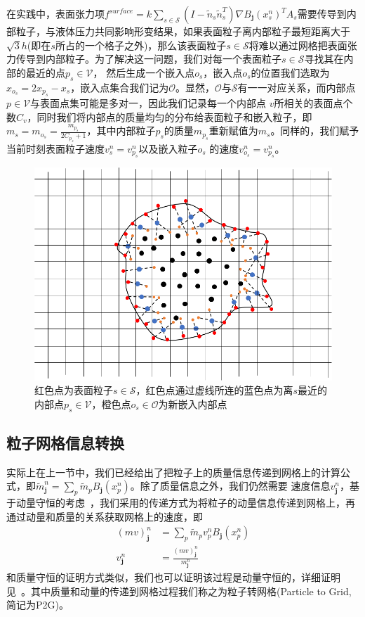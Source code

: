 在实践中，表面张力项$f^{surface} = k\sum_{s\in \mathcal{S}}(I - \tilde{n}_s\tilde{n}_s^T)\nabla B_{\mathbf{j}}(x_s^n)^TA_s$需要传导到内部粒子，与液体压力共同影响形变结果，如果表面粒子离内部粒子最短距离大于
$\sqrt{3}h$(即在$s$所占的一个格子之外)，那么该表面粒子$s\in \mathcal{S}$将难以通过网格把表面张力传导到内部粒子。为了解决这一问题，我们对每一个表面粒子$s\in \mathcal{S}$寻找其在内部的最近的点$p_s \in \mathcal{V}$，
然后生成一个嵌入点$o_s$，嵌入点$o_s$的位置我们选取为$x_{o_s} = 2x_{p_s} - x_s$，嵌入点集合我们记为$\mathcal{O}$。显然，$\mathcal{O}$与$\mathcal{S}$有一一对应关系，而内部点$p\in\mathcal{V}$与表面点集可能是多对一，因此我们记录每一个内部点
$v$所相关的表面点个数$C_v$，同时我们将内部点的质量均匀的分布给表面粒子和嵌入粒子，即$m_s = m_{o_s} = \frac{m_{p_s}}{2C_{p_s} + 1}$，其中内部粒子$p_s$的质量$m_{p_s}$重新赋值为$m_s$。同样的，我们赋予当前时刻表面粒子速度$v_s^n = v_{p_s}^n$以及嵌入粒子$o_s$
的速度$v_{o_s}^n = v_{p_s}^n$。
\begin{figure}[htbp]
    \centering
    \includegraphics[scale=0.7]{./images/image16.png}
    \caption[内嵌粒子图示]{红色点为表面粒子$s\in \mathcal{S}$，红色点通过虚线所连的蓝色点为离$s$最近的内部点$p_s\in \mathcal{V}$，橙色点$o_s\in \mathcal{O}$为新嵌入内部点}
    \label{fig: surface particle inserted}
\end{figure}
\subsection{粒子网格信息转换}
实际上在上一节中，我们已经给出了把粒子上的质量信息传递到网格上的计算公式，即$\tilde{m}^n_{\mathbf{j}} = \sum_p \tilde{m}_p B_{\mathbf{j}}(x_p^n)$。除了质量信息之外，我们仍然需要
速度信息$v_\mathbf{j}^n$，基于动量守恒的考虑~\cite{jiang2016material}，我们采用的传递方式为将粒子的动量信息传递到网格上，再通过动量和质量的关系获取网格上的速度，即
\begin{align}
    (mv)_\mathbf{j}^n &= \sum_{p} \tilde{m}_p v_p^nB_{\mathbf{j}}(x_p^n)\\
    v_\mathbf{j}^n &= \frac{(mv)_\mathbf{j}^n}{m_{\mathbf{j}}^n} 
\end{align}
和质量守恒的证明方式类似，我们也可以证明该过程是动量守恒的，详细证明见~\cite{jiang2016material}。其中质量和动量的传递到网格过程我们称之为粒子转网格(Particle to Grid,简记为P2G)。

